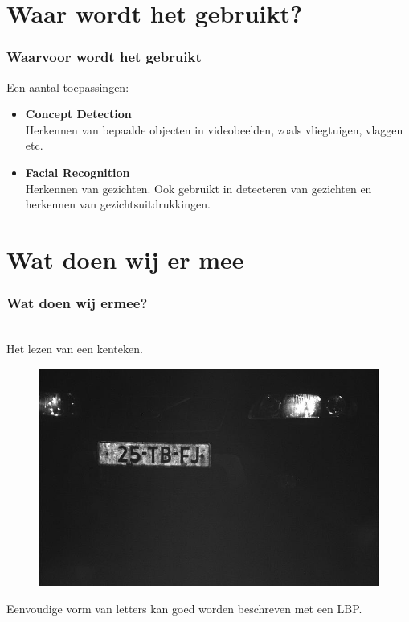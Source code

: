 \documentclass{beamer}
\begin{document}
	\section{Waar wordt het gebruikt?}
  
  \begin{frame}
    \frametitle{Waarvoor wordt het gebruikt}
    Een aantal toepassingen:
    \begin{itemize}
      \item \textbf{Concept Detection}\\
        Herkennen van bepaalde objecten in videobeelden, zoals vliegtuigen, vlaggen etc.
      \item \textbf{Facial Recognition}\\
        Herkennen van gezichten. Ook gebruikt in detecteren van gezichten en herkennen van 
        gezichtsuitdrukkingen.
    \end{itemize}	
  \end{frame}	
	
	\section{Wat doen wij er mee}
  
  \begin{frame}
    \frametitle{Wat doen wij ermee?}
    \\
    Het lezen van een kenteken.
    \begin{figure}
      \includegraphics[scale=0.2]{00991_000000.jpg}
    \end{figure}
    Eenvoudige vorm van letters kan goed worden beschreven met een LBP.
  \end{frame}
		
\end{document}
